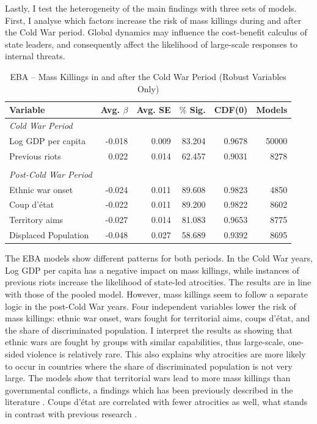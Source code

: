 Lastly, I test the heterogeneity of the main findings with three sets of models. First, I analyse which factors increase the risk of mass killings during and after the Cold War period. Global dynamics may influence the cost-benefit calculus of state leaders, and consequently affect the likelihood of large-scale responses to internal threats. 

\begin{table}[H]
\centering
\begin{tabular}{lrrrrr}
\hline
\textbf{Variable} & \textbf{Avg. $\beta$} & \textbf{Avg. SE} & \textbf{$\%$ Sig.} & \textbf{CDF(0)} & \textbf{Models} \\ \hline
\textit{Cold War Period} &  &  &  &  &  \\
Log GDP per capita & -0.018 & 0.009 & 83.204 & 0.9678 & 50000 \\
Previous riots & 0.022 & 0.014 & 62.457 & 0.9031 & 8278 \\
 &  &  &  &  &  \\
\textit{Post-Cold War Period} &  &  &  &  &  \\
Ethnic war onset & -0.024 & 0.011 & 89.608 & 0.9823 & 4850 \\
Coup d'état & -0.022 & 0.011 & 89.200 & 0.9822 & 8602 \\ 
Territory aims & -0.027 & 0.014 & 81.083 & 0.9653 & 8775 \\ 
Displaced Population & -0.048 & 0.027 & 58.689 & 0.9392 & 8695 \\ \hline
\end{tabular}
\caption{EBA -- Mass Killings in and after the Cold War Period (Robust Variables Only)}
\label{tab:coldwar}
\end{table}

The EBA models show different patterns for both periods. In the Cold War years, Log GDP per capita has a negative impact on mass killings, while instances of previous riots increase the likelihood of state-led atrocities. The results are in line with those of the pooled model. However, mass killings seem to follow a separate logic in the post-Cold War years. Four independent variables lower the risk of mass killings: ethnic war onset, wars fought for territorial aims, coups d'état, and the share of discriminated population. I interpret the results as showing that ethnic wars are fought by groups with similar capabilities, thus large-scale, one-sided violence is relatively rare. This also explains why atrocities are more likely to occur in countries where the share of discriminated population is not very large. The models show that territorial wars lead to more mass killings than governmental conflicts, a findings which has been previously described in the literature \citep[240]{eck2007one}. Coups d'état are correlated with fewer atrocities as well, what stands in contrast with previous research \citep[10]{wayman2010explaining}.

